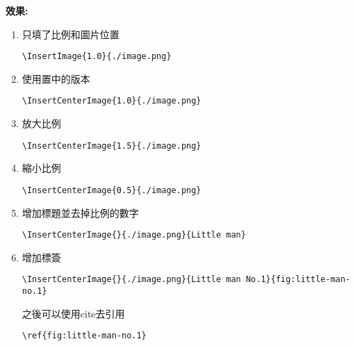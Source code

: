   {\bf 效果:}
  \begin{enumerate}
    \item
    {
      只填了比例和圖片位置\begin{verbatim}\InsertImage{1.0}{./image.png}\end{verbatim}
    } %

    \item
    {
      使用置中的版本\begin{verbatim}\InsertCenterImage{1.0}{./image.png}\end{verbatim}
    } %

    \item
    {
      放大比例\begin{verbatim}\InsertCenterImage{1.5}{./image.png}\end{verbatim}
    } %

    \newpage

    \item
    {
      縮小比例\begin{verbatim}\InsertCenterImage{0.5}{./image.png}\end{verbatim}
    } %

    \item
    {
      增加標題並去掉比例的數字\begin{verbatim}\InsertCenterImage{}{./image.png}{Little man}\end{verbatim}
    } %

    \item
    {
      增加標簽\begin{verbatim}\InsertCenterImage{}{./image.png}{Little man No.1}{fig:little-man-no.1}\end{verbatim}
      之後可以使用cite去引用\begin{verbatim}\ref{fig:little-man-no.1}\end{verbatim}

}
\end{enumerate}
